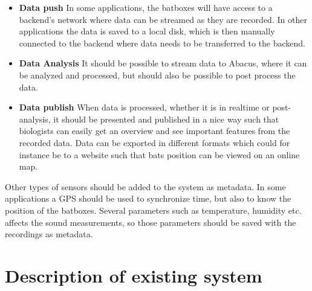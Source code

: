 \begin{itemize}
	\item \textbf{Data push} In some applications, the batboxes will have access to a backend’s network where data can be streamed as they are recorded. In other applications the data is saved to a local disk, which is then manually connected to the backend where data needs to be transferred to the backend.
	
	\item \textbf{Data Analysis} It should be possible to stream data to Abacus, where it can be analyzed and processed, but should also be possible to post process the data.

	\item \textbf{Data publish} When data is processed, whether it is in realtime or post-analysis, it should be presented and published in a nice way such that biologists can easily get an overview and see important features from the recorded data. Data can be exported in different formats which could for instance be to a website such that bats position can be viewed on an online map.

\end{itemize}


Other types of sensors should be added to the system as metadata. In some applications a GPS should be used to synchronize time, but also to know the position of the batboxes. Several parameters such as temperature, humidity etc. affects the sound measurements, so those parameters should be saved with the recordings as metadata. 



\section{Description of existing system}
